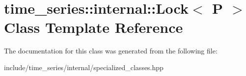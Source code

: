 \hypertarget{classtime__series_1_1internal_1_1Lock}{}\section{time\+\_\+series\+:\+:internal\+:\+:Lock$<$ P $>$ Class Template Reference}
\label{classtime__series_1_1internal_1_1Lock}


The documentation for this class was generated from the following file\+:\begin{DoxyCompactItemize}
\item 
include/time\+\_\+series/internal/specialized\+\_\+classes.\+hpp\end{DoxyCompactItemize}

